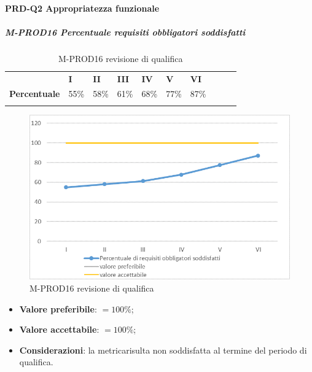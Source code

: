 \paragraph*{PRD-Q2 Appropriatezza funzionale}
\subparagraph{M-PROD16 Percentuale requisiti obbligatori soddisfatti} \mbox{}
\begin{longtable}[H!] {						
		>{}p{50mm}  		
		>{}p{8mm}
		>{}p{8mm}		
		>{}p{8mm}		
		>{}p{8mm}		
		>{}p{8mm}		
		>{}p{8mm}
		>{}p{8mm}
		>{}p{8mm}
		>{}p{8mm}
	}
	\rowcolor{gray!50}
	\textbf{} & \textbf{I} & \textbf{II} & \textbf{III} & \textbf{IV} & \textbf{V} & \textbf{VI} \TBstrut \\ [2mm]
	\textbf{Percentuale} & 55\% & 58\% & 61\% & 68\% & 77\% & 87\% \TBstrut \\ [2mm]
	\rowcolor{white}
	\caption{M-PROD16 revisione di qualifica}
\end{longtable}
\begin{figure}[H] 	
	\includegraphics[width=\linewidth]{./img/grafici/RQ16.png}	
	\caption{M-PROD16 revisione di qualifica}	
\end{figure}
\begin{itemize}
	\item \textbf{Valore preferibile}: $=100\%$;
	\item \textbf{Valore accettabile}: $=100\%$;
	\item \textbf{Considerazioni}: la metrica\glosp risulta non soddisfatta al termine del periodo di qualifica.
\end{itemize}

